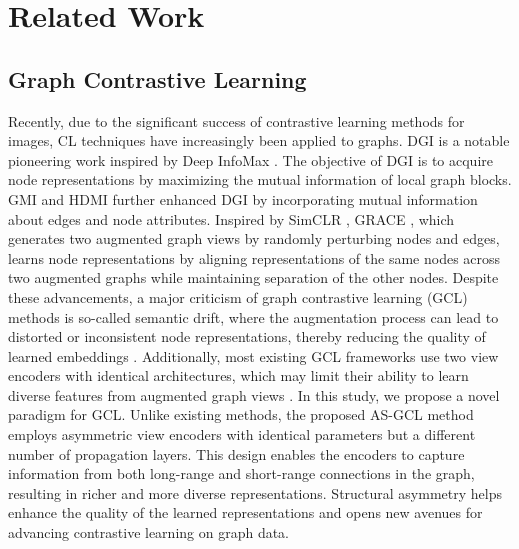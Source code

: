 \section{Related Work}
\label{Related Work}
\subsection{Graph Contrastive Learning}
Recently, due to the significant success of contrastive learning methods for images, CL techniques have increasingly been applied to graphs. DGI \cite{velivckovic2018deep} is a notable pioneering work inspired by Deep InfoMax \cite{hjelm2018learning}. The objective of DGI is to acquire node representations by maximizing the mutual information of local graph blocks. GMI \cite{peng2020graph} and HDMI \cite{jing2021hdmi} further enhanced DGI by incorporating mutual information about edges and node attributes. Inspired by SimCLR \cite{chen2020simple}, GRACE \cite{zhu2020deep}, which generates two augmented graph views by randomly perturbing nodes and edges, learns node representations by aligning representations of the same nodes across two augmented graphs while maintaining separation of the other nodes. Despite these advancements, a major criticism of graph contrastive learning (GCL) methods is so-called semantic drift, where the augmentation process can lead to distorted or inconsistent node representations, thereby reducing the quality of learned embeddings \cite{sun2021mocl}. Additionally, most existing GCL frameworks use two view encoders with identical architectures, which may limit their ability to learn diverse features from augmented graph views \cite{sun2021mocl}. In this study, we propose a novel paradigm for GCL. Unlike existing methods, the proposed AS-GCL method employs asymmetric view encoders with identical parameters but a different number of propagation layers. This design enables the encoders to capture information from both long-range and short-range connections in the graph, resulting in richer and more diverse representations. Structural asymmetry helps enhance the quality of the learned representations and opens new avenues for advancing contrastive learning on graph data.


